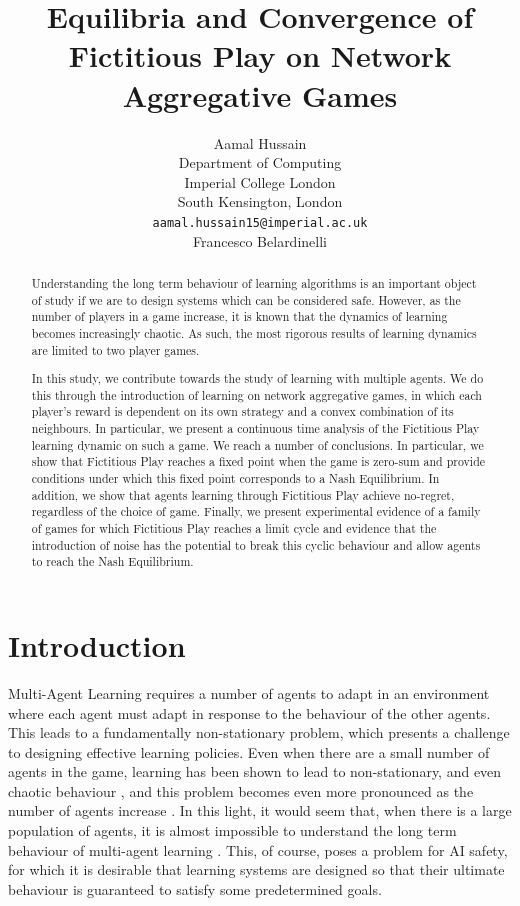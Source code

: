 \documentclass{article}
\title{Equilibria and Convergence of Fictitious Play on Network Aggregative Games}
\author{%
 Aamal Hussain  \\
  Department of Computing\\
  Imperial College London\\
  South Kensington, London \\
  \texttt{aamal.hussain15@imperial.ac.uk} \\
  \And
  Francesco Belardinelli
}
\theoremstyle{definition}
\begin{document}
\maketitle

\begin{abstract}
  Understanding the long term behaviour of learning algorithms is an important object of study if we are to design systems which can be considered safe. However, as the number of players in a game increase, it is known that the dynamics of learning becomes increasingly chaotic. As such, the most rigorous results of learning dynamics are limited to two player games.

  In this study, we contribute towards the study of learning with multiple agents. We do this through the introduction of learning on network aggregative games, in which each player's reward is dependent on its own strategy and a convex combination of its neighbours. In particular, we present a continuous time analysis of the Fictitious Play learning dynamic on such a game. We reach a number of conclusions. In particular, we show that Fictitious Play reaches a fixed point when the game is zero-sum and provide conditions under which this fixed point corresponds to a Nash Equilibrium. In addition, we show that agents learning through Fictitious Play achieve no-regret, regardless of the choice of game. Finally, we present experimental evidence of a family of games for which Fictitious Play reaches a limit cycle and evidence that the introduction of noise has the potential to break this cyclic behaviour and allow agents to reach the Nash Equilibrium.
\end{abstract}

\section{Introduction}

Multi-Agent Learning \cite{Schwartz} requires a number of agents to adapt in an environment where
each agent must adapt in response to the behaviour of the other agents. This leads to a
fundamentally non-stationary problem, which presents a challenge to designing effective learning
policies. Even when there are a small number of agents in the game, learning has been shown to lead
to non-stationary, and even chaotic behaviour \cite{SatoChaos}, and this problem becomes even more
pronounced as the number of agents increase \cite{Sanders}. In this light, it would seem that, when there is a large population of agents, it is almost impossible to understand the long term behaviour of multi-agent learning \cite{PiliourasChaoticMaps}. This, of course, poses a problem for AI safety, for which it is desirable that learning systems are designed so that their ultimate behaviour is guaranteed to satisfy some predetermined goals.
\end{document}
